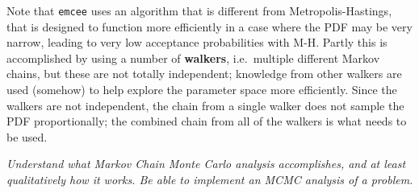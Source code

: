 \documentclass{article}
\newcommand{\test}[1]{%
    \begin{center}
        \colorbox{hl}{\parbox{0.9\textwidth}{\emph{\centering #1}}}
    \end{center}}
\begin{document}
Note that \texttt{emcee} uses an algorithm that is different from
Metropolis-Hastings, that is designed to function more efficiently in a case
where the PDF may be very narrow, leading to very low acceptance probabilities
with M-H. Partly this is accomplished by using a number of \textbf{walkers},
i.e.\ multiple different Markov chains, but these are not totally independent;
knowledge from other walkers are used (somehow) to help explore the parameter
space more efficiently. Since the walkers are not independent, the chain from a
single walker does not sample the PDF proportionally; the combined chain from
all of the walkers is what needs to be used.

\test{Understand what Markov Chain Monte Carlo analysis accomplishes, and at
least qualitatively how it works. Be able to implement an MCMC analysis of
a problem.}
\end{document}
